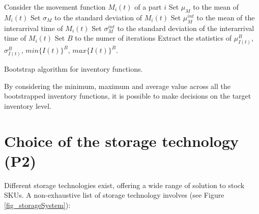 \begin{algorithm}[H]
\DontPrintSemicolon
\SetAlgoLined
Consider the movement function $M_i(t)$ of a part $i$\;
Set $\mu_M$ to the mean of $M_i(t)$\;
Set $\sigma_M$ to the standard deviation of $M_i(t)$\;
Set $\mu_M^{int}$ to the mean of the interarrival time of $M_i(t)$\;
Set $\sigma_M^{int}$ to the standard deviation of the interarrival time of $M_i(t)$\;
Set $B$ to the numer of iterations \;
Extract the statistics of $\mu_{I(t)}^{B}$, $\sigma_{I(t)}^{B}$, $min\{I(t)\}^{B}$, $max\{I(t)\}^{B}$.
    
\caption{Bootstrap algorithm for inventory functions.}
\label{algo_inventory_bootstrap}
\end{algorithm}

By considering the minimum, maximum and average value across all the bootstrapped inventory functions, it is possible to make decisions on the target inventory level.

\section{Choice of the storage technology (P2)}

Different storage technologies exist, offering a wide range of solution to stock SKUs. A non-exhaustive list of storage technology involves (see Figure \ref{fig_storageSystem}):

